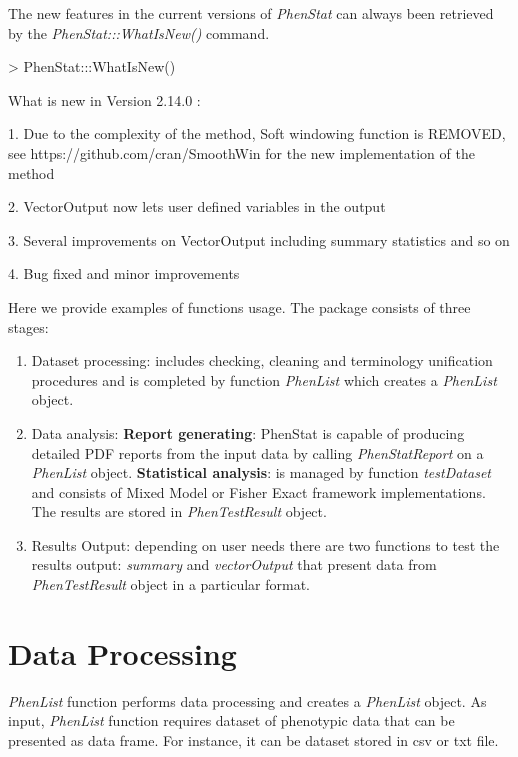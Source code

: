 \documentclass[a4paper]{article}
\begin{document}
The new features in the current versions of \emph{PhenStat} can always been retrieved by the \emph{PhenStat:::WhatIsNew()} command.
\begin{Schunk}
\begin{Sinput}
> PhenStat:::WhatIsNew()
\end{Sinput}
\begin{Soutput}
	What is new in Version 2.14.0 :

	1. Due to the complexity of the method, Soft windowing function is REMOVED,
		see https://github.com/cran/SmoothWin for the new implementation of the method

	2. VectorOutput now lets user defined variables in the output

	3. Several improvements on VectorOutput including summary statistics and so on

	4. Bug fixed and minor improvements
\end{Soutput}
\end{Schunk}
Here we provide examples of functions usage. The package consists of three stages:
\begin{enumerate}
\item Dataset processing: includes checking, cleaning and terminology unification procedures and is completed
by function \textit{PhenList} which creates a \textit{PhenList} object.
\item Data analysis:
\subitem \textbf{Report generating}: PhenStat is capable of producing detailed PDF reports from the input data by calling \textit{PhenStatReport} on a \textit{PhenList} object.
\subitem \textbf{Statistical analysis}: is managed by function \textit{testDataset} and consists of Mixed Model or
Fisher Exact framework implementations. The results are stored in \textit{PhenTestResult} object.
\item Results Output: depending on user needs there are two functions to test the results output:
\textit{summary} and \textit{vectorOutput} that present data from \textit{PhenTestResult} object
in a particular format.
\end{enumerate}


\tableofcontents

\section{Data Processing}
\textit{PhenList} function performs data processing and creates a \textit{PhenList} object.
As input, \textit{PhenList} function requires dataset of phenotypic data that can be presented as data frame.
For instance, it can be dataset stored in csv or txt file.
\end{document}
